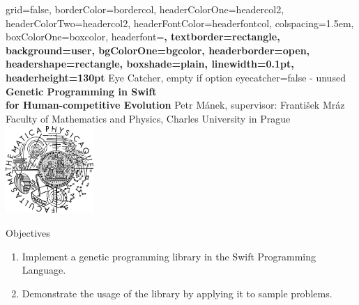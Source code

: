 \documentclass[a0paper,portrait]{baposter}
\newcommand{\compresslist}{
	\setlength{\itemsep}{1pt}
	\setlength{\parskip}{0pt}
	\setlength{\parsep}{0pt}
}
\begin{document}


\begin{poster}{
	grid=false,
	borderColor=bordercol,
	headerColorOne=headercol2,
	headerColorTwo=headercol2,
	headerFontColor=headerfontcol,
	colspacing=1.5em,
	boxColorOne=boxcolor,
	headerfont=\Large\bf{}\selectfont,
	textborder=rectangle,
	background=user,
	bgColorOne=bgcolor,
	headerborder=open,
	headershape=rectangle,
	boxshade=plain,
	linewidth=0.1pt,
	headerheight=130pt
}
{
	Eye Catcher, empty if option eyecatcher=false - unused
}
{\bf{}\selectfont
	Genetic Programming in Swift\\
	for Human-competitive Evolution
}
{
	\vspace{1em} Petr Mánek, supervisor: František Mráz\\
	{\smaller Faculty of Mathematics and Physics, Charles University in Prague}
}
{
	\includegraphics[width=9em,height=9em]{logo}
}

\begin{posterbox}[name=objectives,column=0]{Objectives}
	\begin{enumerate}[leftmargin=*]
		\compresslist
		\item Implement a genetic programming library in the Swift Programming Language.
		\item Demonstrate the usage of the library by applying it to sample problems.
	\end{enumerate}
\end{posterbox}


\end{poster}
\end{document}
